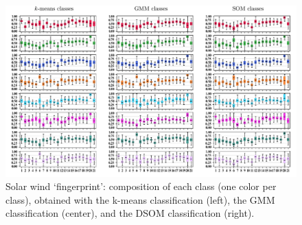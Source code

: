 \documentclass[utf8]{frontiersSCNS} %
\begin{document}
\begin{figure}[h!]\centering
	\includegraphics[width=18cm]{classesdatarange}
	\caption{Solar wind `fingerprint': composition of each class (one color per class), obtained with the k-means classification (left), the GMM classification (center), and the DSOM classification (right).}\label{fig:classesdatarange}
\end{figure}
\end{document}
